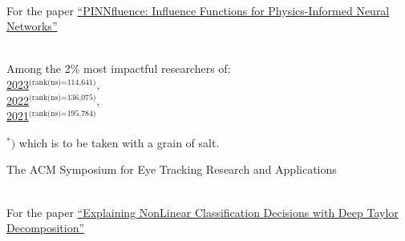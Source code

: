 
{
    \ifdefined\shortcv
        {}
    \else
        {
            \\
            \hspace*{\fill} For the paper
            \href{https://ml4physicalsciences.github.io/2024/files/NeurIPS_ML4PS_2024_254.pdf}{``PINNfluence: Influence Functions for Physics-Informed Neural Networks''}
        }
    \fi
}

{
    \ifdefined\shortcv
        {}
    \else
        {
            \\
            \hspace*{\fill}Among the 2\% most impactful researchers of:\\
            \hspace*{\fill}
            \href{https://elsevier.digitalcommonsdata.com/datasets/btchxktzyw/7}{2023}$^\text{(rank(ns)=114,641)}$,\\
            \hspace*{\fill}
            \href{https://elsevier.digitalcommonsdata.com/datasets/btchxktzyw/6}{2022}$^\text{(rank(ns)=136,075)}$,\\
            \hspace*{\fill}
            \href{https://elsevier.digitalcommonsdata.com/datasets/btchxktzyw/4}{2021}$^\text{(rank(ns)=195,784)}$\phantom{,}

            
            
            \hspace*{\fill}$^\ast )$ which is to be taken with a grain of salt. 
        }
    \fi
}



{
    \ifdefined\shortcv
        {}
    \else
        {
            The ACM Symposium for Eye Tracking Research and Applications
        }
    \fi
}



{
    \ifdefined\shortcv
        {}
    \else
        {
            \\
            \hspace*{\fill} For the paper
            \href{https://doi.org/10.1016/j.patcog.2016.11.008}{``Explaining NonLinear Classification Decisions with Deep Taylor Decomposition''}
        }
    \fi
}


